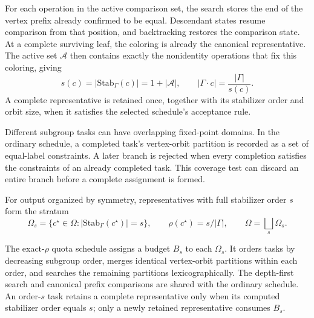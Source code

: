 For each operation in the active comparison set, the search stores the end of the vertex prefix already confirmed to be equal. Descendant states resume comparison from that position, and backtracking restores the comparison state. At a complete surviving leaf, the coloring is already the canonical representative. The active set $\mathcal{A}$ then contains exactly the nonidentity operations that fix this coloring, giving
\begin{equation}
 s(c)=|\mathrm{Stab}_{\Gamma}(c)|=1+|\mathcal{A}|,
 \qquad |\Gamma\cdot c|=\frac{|\Gamma|}{s(c)}.
\label{eq:active_stabilizer}
\end{equation}
A complete representative is retained once, together with its stabilizer order and orbit size, when it satisfies the selected schedule's acceptance rule.

Different subgroup tasks can have overlapping fixed-point domains. In the ordinary schedule, a completed task's vertex-orbit partition is recorded as a set of equal-label constraints. A later branch is rejected when every completion satisfies the constraints of an already completed task. This coverage test can discard an entire branch before a complete assignment is formed.

For output organized by symmetry, representatives with full stabilizer order $s$ form the stratum
\begin{equation}
\Omega_s=\{c^\star\in\Omega:|\mathrm{Stab}_{\Gamma}(c^\star)|=s\},
\qquad \rho(c^\star)=s/|\Gamma|,
\qquad \Omega=\bigsqcup_s\Omega_s.
\label{eq:rho_strata}
\end{equation}

The exact-$\rho$ quota schedule assigns a budget $B_s$ to each $\Omega_s$. It orders tasks by decreasing subgroup order, merges identical vertex-orbit partitions within each order, and searches the remaining partitions lexicographically. The depth-first search and canonical prefix comparisons are shared with the ordinary schedule. An order-$s$ task retains a complete representative only when its computed stabilizer order equals $s$; only a newly retained representative consumes $B_s$.

